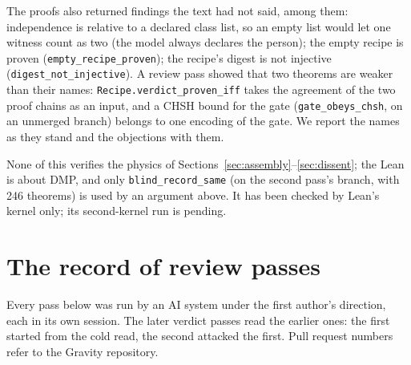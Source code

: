 \documentclass[11pt,a4paper]{article}
\theoremstyle{definition}
\theoremstyle{remark}
\newcommand{\lean}[1]{\texttt{#1}}
\begin{document}
The proofs also returned findings the text had not said, among them: independence is relative to a declared class list, so an empty list
would let one witness count as two (the model always declares the person); the empty recipe is proven (\lean{empty\_recipe\_proven});
the recipe's digest is not injective (\lean{digest\_not\_injective}). A review pass showed that two theorems are weaker
than their names: \lean{Recipe.verdict\_proven\_iff} takes the agreement of the two proof chains as an input, and a CHSH bound for the
gate (\lean{gate\_obeys\_chsh}, on an unmerged branch) belongs to one encoding of the gate. We report the names as they stand and the
objections with them.

None of this verifies the physics of Sections~\ref{sec:assembly}--\ref{sec:dissent}; the Lean is about DMP, and only
\lean{blind\_record\_same} (on the second pass's branch, with 246 theorems) is used by an argument above. It has been checked by
Lean's kernel only; its second-kernel run is pending.

\section{The record of review passes}\label{sec:record}

Every pass below was run by an AI system under the first author's direction, each in its own session. The later verdict passes read
the earlier ones: the first started from the cold read, the second attacked the first. Pull request numbers refer to the Gravity repository.
\end{document}
